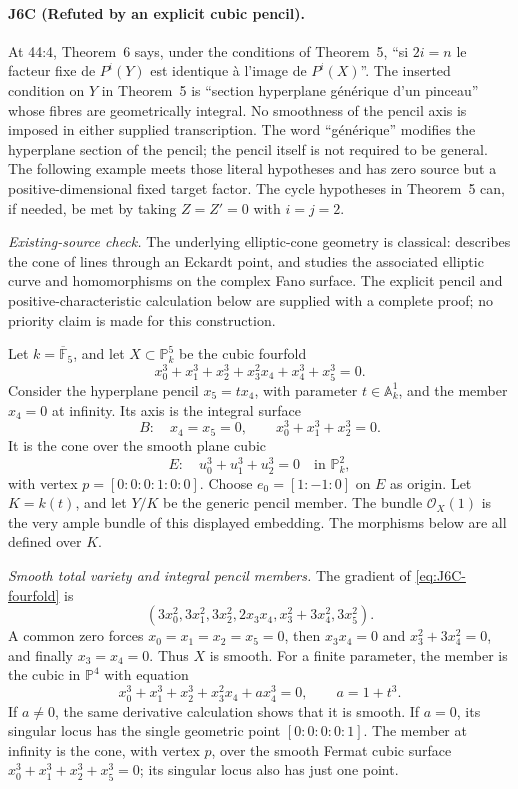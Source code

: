 \paragraph{J6C (Refuted by an explicit cubic pencil).}
At 44:4, Theorem~6 says, under the conditions of Theorem~5,
``si $2i=n$ le facteur fixe de $P^i(Y)$ est identique à
l'image de $P^i(X)$''. The inserted condition on $Y$ in
Theorem~5 is ``section hyperplane générique d'un pinceau''
whose fibres are geometrically integral. No smoothness of the
pencil axis is imposed in either supplied transcription.
The word ``générique'' modifies the hyperplane section of the
pencil; the pencil itself is not required to be general.
The following example meets those literal hypotheses and has
zero source but a positive-dimensional fixed target factor.
The cycle hypotheses in Theorem~5 can, if needed, be met by
taking $Z=Z'=0$ with $i=j=2$.

\emph{Existing-source check.}
The underlying elliptic-cone geometry is classical:
\cite[Lemma 8.1, pp.~314--315]{DGJ_ClemensGriffiths1972}
describes the cone of lines through an Eckardt point, and
\cite[Proposition 10, p.~384; Lemma 29, p.~398]{DGJ_Roulleau2009}
studies the associated elliptic curve and homomorphisms on the
complex Fano surface. The explicit pencil and positive-characteristic
calculation below are supplied with a complete proof; no priority
claim is made for this construction.

Let $k=\overline{\mathbb F}_5$, and let $X\subset\mathbb P^5_k$
be the cubic fourfold
\begin{equation}\label{eq:J6C-fourfold}
 x_0^3+x_1^3+x_2^3+x_3^2x_4+x_4^3+x_5^3=0.
\end{equation}
Consider the hyperplane pencil $x_5=t x_4$, with parameter
$t\in\mathbb A^1_k$, and the member $x_4=0$ at infinity.
Its axis is the integral surface
\[
 B:\quad x_4=x_5=0,\qquad x_0^3+x_1^3+x_2^3=0.
\]
It is the cone over the smooth plane cubic
\[
 E:\quad u_0^3+u_1^3+u_2^3=0\quad\text{in }\mathbb P^2_k,
\]
with vertex $p=[0:0:0:1:0:0]$. Choose
$e_0=[1:-1:0]$ on $E$ as origin. Let $K=k(t)$, and let
$Y/K$ be the generic pencil member. The bundle
$\mathcal O_X(1)$ is the very ample bundle of this displayed
embedding. The morphisms below are all defined over $K$.

\emph{Smooth total variety and integral pencil members.}
The gradient of \eqref{eq:J6C-fourfold} is
\[
 (3x_0^2,3x_1^2,3x_2^2,2x_3x_4,
   x_3^2+3x_4^2,3x_5^2).
\]
A common zero forces $x_0=x_1=x_2=x_5=0$, then
$x_3x_4=0$ and $x_3^2+3x_4^2=0$, and finally
$x_3=x_4=0$. Thus $X$ is smooth. For a finite parameter,
the member is the cubic in $\mathbb P^4$ with equation
\begin{equation}\label{eq:J6C-member}
 x_0^3+x_1^3+x_2^3+x_3^2x_4+a x_4^3=0,
 \qquad a=1+t^3.
\end{equation}
If $a\ne0$, the same derivative calculation shows that it
is smooth. If $a=0$, its singular locus has the single
geometric point $[0:0:0:0:1]$. The member at infinity is
the cone, with vertex $p$, over the smooth Fermat cubic
surface $x_0^3+x_1^3+x_2^3+x_5^3=0$; its singular locus
also has just one point.

